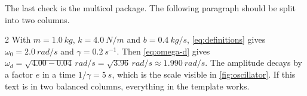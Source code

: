 The last check is the multicol package.
The following paragraph should be split into two columns.

\begin{multicols}{2}
With $m = \qty{1.0}{kg}$, $k = \qty{4.0}{N/m}$ and $b = \qty{0.4}{kg/s}$, \cref{eq:definitions} gives $\omega_0 = \qty{2.0}{rad/s}$ and $\gamma = \qty{0.2}{s^{-1}}$.
Then \cref{eq:omega-d} gives $\omega_d = \sqrt{4.00 - 0.04}\,\unit{rad/s} = \sqrt{3.96}\,\unit{rad/s} \approx \qty{1.990}{rad/s}$.
The amplitude decays by a factor $e$ in a time $1/\gamma = \qty{5}{s}$, which is the scale visible in \cref{fig:oscillator}.
If this text is in two balanced columns, everything in the template works.
\end{multicols}
